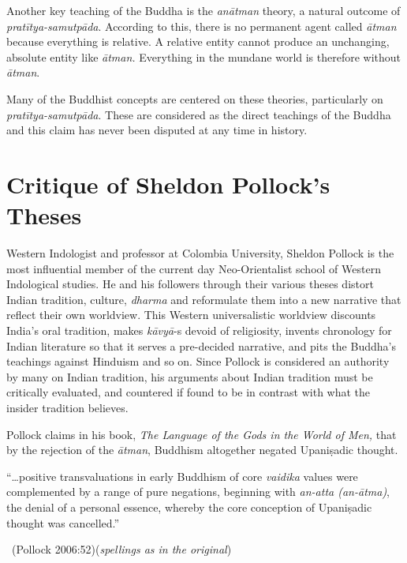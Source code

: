 Another key teaching of the Buddha is the \textit{anātman} theory, a natural outcome of \textit{pratītya-samutpāda}. According to this, there is no permanent agent called \textit{ātman} because everything is relative. A relative entity cannot produce an unchanging, absolute entity like \textit{ātman.} Everything in the mundane world is therefore without \textit{ātman}.

Many of the Buddhist concepts are centered on these theories, particularly on \textit{pratītya-samutpāda}. These are considered as the direct teachings of the Buddha and this claim has never been disputed at any time in history.

\vspace{-.3cm}

\section*{Critique of Sheldon Pollock’s Theses}

Western Indologist and professor at Colombia University, Sheldon Pollock is the most influential member of the current day Neo-Orientalist school of Western Indological studies. He and his followers through their various theses distort Indian tradition, culture, \textit{dharma} and reformulate them into a new narrative that reflect their own worldview. This Western universalistic worldview discounts India’s oral tradition, makes \textit{kāvyā}-s devoid of religiosity, invents chronology for Indian literature so that it serves a pre-decided narrative, and pits the Buddha’s teachings against Hinduism and so on. Since Pollock is considered an authority by many on Indian tradition, his arguments about Indian tradition must be critically evaluated, and countered if found to be in contrast with what the insider tradition believes.

Pollock claims in his book, \textit{The Language of the Gods in the World of Men,} that by the rejection of the \textit{ātman}, Buddhism altogether negated Upaniṣadic thought.

\begin{myquote}
“…positive transvaluations in early Buddhism of core \textit{vaidika} values were complemented by a range of pure negations, beginning with \textit{an-atta (an-ātma)}, the denial of a personal essence, whereby the core conception of Upaniṣadic thought was cancelled.” 

~\hfill (Pollock 2006:52)(\textit{spellings as in the original})
\end{myquote}

